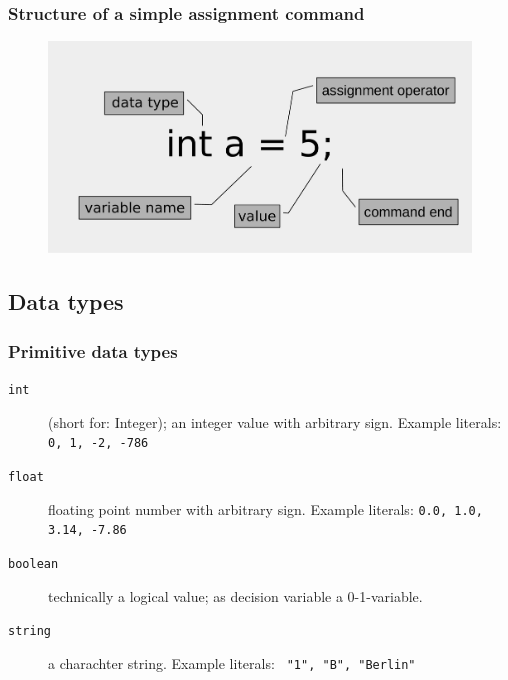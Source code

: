 \begin{frame}
 \frametitle{Structure of a simple assignment command}
 \begin{figure}
  \centering
  \includegraphics[width=\linewidth]{Bilder/OPL-Anweisung}
 \end{figure}
\end{frame}

\subsection{Data types}
\begin{frame}
 \frametitle{Primitive data types}
 \begin{description}
  \item[\texttt{int}] (short for: \glqq Integer\grqq); an integer value with arbitrary sign. 
  Example literals: \texttt{0, 1, -2, -786}
  \item[\texttt{float}] floating point number with arbitrary sign.
  Example literals: \texttt{0.0, 1.0, 3.14, -7.86}
  \item[\texttt{boolean}] technically a logical value; as decision variable a 0-1-variable.
  \item[\texttt{string}] a charachter string. Example literals:
  \texttt{ "1", "B", "Berlin"}
 \end{description}
\end{frame}


